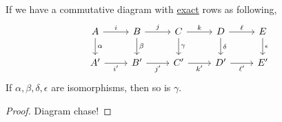 \begin{lemma}\label{lma:the-five-lemma}
	If we have a commutative diagram with \hyperref[def:exact]{exact} rows as following,
	\[
		\begin{tikzcd}
			A & B & C & D & E \\
			{A^\prime} & {B^\prime} & {C^\prime} & {D^\prime} & {E^\prime}
			\arrow["\alpha", from=1-1, to=2-1]
			\arrow["\gamma", from=1-3, to=2-3]
			\arrow["\delta", from=1-4, to=2-4]
			\arrow["\epsilon", from=1-5, to=2-5]
			\arrow["{i^\prime}"', from=2-1, to=2-2]
			\arrow["\beta", from=1-2, to=2-2]
			\arrow["{j^\prime}"', from=2-2, to=2-3]
			\arrow["{k^\prime}"', from=2-3, to=2-4]
			\arrow["{\ell^\prime}"', from=2-4, to=2-5]
			\arrow["\ell", from=1-4, to=1-5]
			\arrow["k", from=1-3, to=1-4]
			\arrow["j", from=1-2, to=1-3]
			\arrow["i", from=1-1, to=1-2]
		\end{tikzcd}
	\]
	If \(\alpha, \beta, \delta, \epsilon\) are isomorphisms, then so is \(\gamma\).
\end{lemma}
\begin{proof}
	Diagram chase!
\end{proof}
